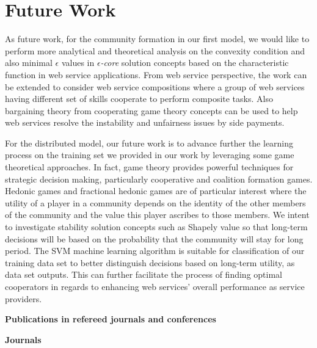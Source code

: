 

\section{Future Work}

As future work, for the community formation in our first model, we would like to perform more analytical and theoretical analysis on the convexity condition and also minimal
$\epsilon$ values in \emph{$\epsilon$-core} solution concepts based on the characteristic function in web service applications. From web service perspective, the work can be extended to consider web service compositions where a group of web services having different set of skills cooperate to perform composite tasks. Also bargaining theory from cooperating game theory concepts can be used to help web services resolve the instability and unfairness issues by side payments.

For the distributed model, our future work is to advance further the learning process on the training set we provided in our work by leveraging some game theoretical approaches. In fact, game theory provides powerful techniques for strategic decision making, particularly cooperative and coalition formation games. Hedonic games and fractional hedonic games are of particular interest where the utility of a player in a community depends on the identity of the other members of the community and the value this player ascribes to those members. We intent to investigate stability solution concepts such as Shapely value so that long-term decisions will be based on the probability that the community will stay for long period. The SVM machine learning algorithm is suitable for classification of our training data set to better distinguish  decisions based on long-term utility, as data set outputs. This can further facilitate the process of finding optimal cooperators in regards to enhancing web services' overall performance as service providers.

\newpage
\textbf{Publications in refereed journals and conferences}

\textbf{Journals}

